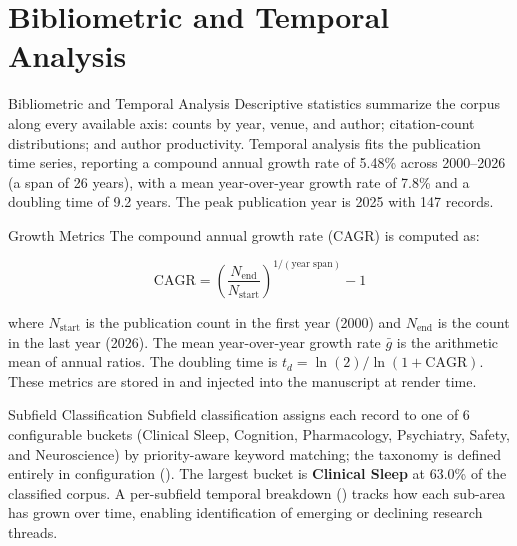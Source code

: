 \documentclass[
  ignorenonframetext,
]{beamer}
\author{\texorpdfstring{}{}}
\date{}
\begin{document}
\section{Bibliometric and Temporal
Analysis}\label{bibliometric-and-temporal-analysis}

\begin{frame}[allowframebreaks]{Bibliometric and Temporal Analysis}
Descriptive statistics summarize the corpus along every available axis:
counts by year, venue, and author; citation-count distributions; and
author productivity. Temporal analysis fits the publication time series,
reporting a compound annual growth rate of 5.48\% across 2000--2026 (a
span of 26 years), with a mean year-over-year growth rate of 7.8\% and a
doubling time of 9.2 years. The peak publication year is 2025 with 147
records.
\end{frame}

\begin{frame}{Growth Metrics}
\protect{}\label{growth-metrics}
The compound annual growth rate (CAGR) is computed as:

\[
\text{CAGR} = \left(\frac{N_{\text{end}}}{N_{\text{start}}}\right)^{1/(\text{year span})} - 1
\]

where \(N_{\text{start}}\) is the publication count in the first year
(2000) and \(N_{\text{end}}\) is the count in the last year (2026). The
mean year-over-year growth rate \(\bar{g}\) is the arithmetic mean of
annual ratios. The doubling time is
\(t_d = \ln(2) / \ln(1 + \text{CAGR})\). These metrics are stored in
 and injected into the manuscript at
render time.
\end{frame}

\begin{frame}{Subfield Classification}
\protect{}\label{subfield-classification}
Subfield classification assigns each record to one of 6 configurable
buckets (Clinical Sleep, Cognition, Pharmacology, Psychiatry, Safety,
and Neuroscience) by priority-aware keyword matching; the taxonomy is
defined entirely in configuration
(). The largest bucket is
\textbf{Clinical Sleep} at 63.0\% of the classified corpus. A
per-subfield temporal breakdown ()
tracks how each sub-area has grown over time, enabling identification of
emerging or declining research threads.
\end{frame}
\end{document}
